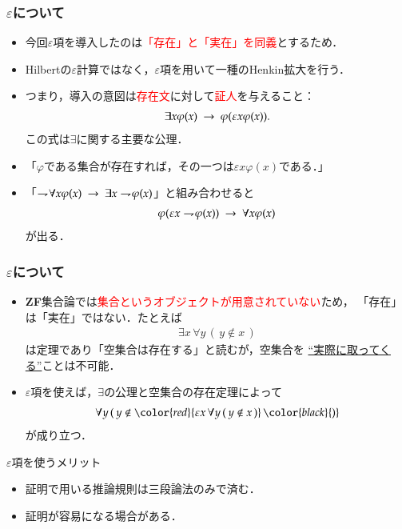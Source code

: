 \documentclass[dvipdfmx,10pt,notheorems]{beamer}
\theoremstyle{definition}
\newcommand{\negation}{\rightharpoondown\hspace{-0.25em}} %
\newcommand{\rarrow}{\hspace{0.25em}\rightarrow\hspace{0.25em}} %
\begin{document}
\begin{frame}\frametitle{$\varepsilon$について}
	\begin{itemize}
		\item 今回$\varepsilon$項を導入したのは\textcolor{red}{「存在」と「実在」を同義}とするため．
		
		\item Hilbertの$\varepsilon$計算ではなく，$\varepsilon$項を用いて一種のHenkin拡大を行う． 
			
		\item つまり，導入の意図は\textcolor{red}{存在文}に対して\textcolor{red}{証人}を与えること：
			\begin{align}
				\exists x \varphi(x) \rarrow \varphi(\varepsilon x \varphi(x)).
			\end{align}
			この式は$\exists$に関する主要な公理．
			
		\item 「$\varphi$である集合が存在すれば，その一つは$\varepsilon x \varphi(x)$である．」
		
		\item 「$\negation \forall x \varphi(x) \rarrow \exists x \negation \varphi(x)$」と組み合わせると
			\begin{align}
				\varphi(\varepsilon x \negation \varphi(x)) \rarrow \forall x \varphi(x)
			\end{align}
			が出る．
	\end{itemize}
\end{frame}

\begin{frame}\frametitle{$\varepsilon$について}
	\begin{itemize}
	\setlength{\itemsep}{10pt}
		\item {\bf ZF}集合論では\textcolor{red}{集合というオブジェクトが用意されていない}ため，
			「存在」は「実在」ではない．たとえば
			\begin{align}
				\exists x\, \forall y\, (\, y \notin x\, )
			\end{align}
			は定理であり「空集合は存在する」と読むが，空集合を
			\underline{``実際に取ってくる''}ことは不可能．
			
		\item $\varepsilon$項を使えば，$\exists$の公理と空集合の存在定理によって
			\begin{align}
				\forall y\, (\, y \notin \color{red}{\varepsilon x\, \forall y\, (\, y \notin x\, )}\, \color{black}{)}
			\end{align}
			が成り立つ．
	\end{itemize}
	
	\begin{block}{$\varepsilon$項を使うメリット}
		\begin{itemize}
			\item 証明で用いる推論規則は三段論法のみで済む．
			\item 証明が容易になる場合がある．
		\end{itemize}
	\end{block}
\end{frame}
\end{document}
